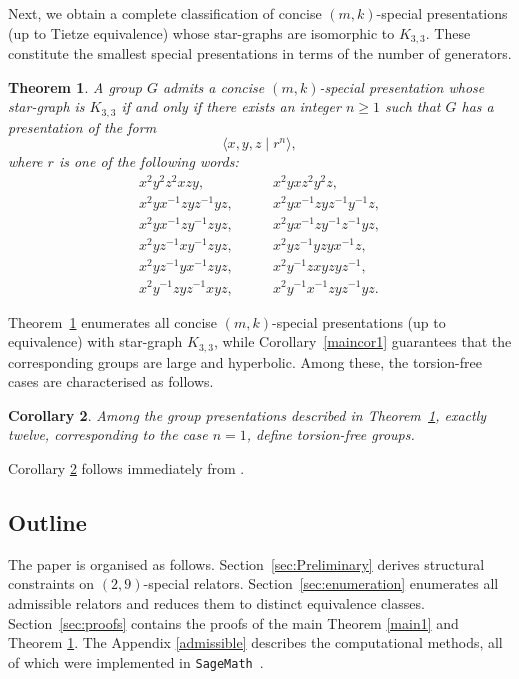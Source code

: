 \documentclass[a4paper,12pt,oneside]{article}
\newtheorem{maintheorem}{Theorem}
\newtheorem{maincorollary}[maintheorem]{Corollary}
\begin{document}
\medskip
Next, we obtain a complete classification of concise $(m,k)$-special presentations (up to Tietze equivalence) whose star-graphs are isomorphic to $K_{3,3}$. These constitute the smallest special presentations in terms of the number of generators.
\newpage
\begin{maintheorem}\label{main2}
A group \(G\) admits a concise \((m,k)\)-special presentation whose star-graph is \(K_{3,3}\) if and only if there exists an integer \(n \ge 1\) such that \(G\) has a presentation of the form
\[
\langle x,y,z \mid r^n \rangle,
\]
where \(r\) is one of the following words:
\begin{align*}
x^2 y^2 z^2 x z y,
&\qquad x^2 y x z^2 y^2 z, \\
x^2 y x^{-1} z y z^{-1} y z, 
&\qquad x^2 y x^{-1} z y z^{-1} y^{-1} z, \\
x^2 y x^{-1} z y^{-1} z y z, 
&\qquad x^2 y x^{-1} z y^{-1} z^{-1} y z, \\
x^2 y z^{-1} x y^{-1} z y z, 
&\qquad x^2 y z^{-1} y z y x^{-1} z, \\
x^2 y z^{-1} y x^{-1} z y z, 
&\qquad x^2 y^{-1} z x y z y z^{-1}, \\
x^2 y^{-1} z y z^{-1} x y z,
&\qquad x^2 y^{-1} x^{-1} z y z^{-1} y z.
\end{align*}
\end{maintheorem}


\medskip
Theorem~\ref{main2} enumerates all concise $(m,k)$-special presentations (up to equivalence) with star-graph $K_{3,3}$, while Corollary~\ref{maincor1} guarantees that the corresponding groups are large and hyperbolic. Among these, the torsion-free cases are characterised as follows.

\begin{maincorollary}\label{maincor2}
Among the group presentations described in Theorem~\ref{main2}, exactly twelve, corresponding to the case $n=1$, define torsion-free groups.
\end{maincorollary}
Corollary \ref{maincor2} follows immediately from \cite[Theorem 3]{MR124384}.

\subsection{Outline}
The paper is organised as follows. Section~\ref{sec:Preliminary} derives structural constraints on $(2,9)$-special relators.  Section~\ref{sec:enumeration} enumerates all admissible relators and reduces them to distinct equivalence classes.  Section~\ref{sec:proofs} contains the proofs of the main Theorem \ref{main1} and Theorem \ref{main2}.  The Appendix \ref{admissible} describes the computational methods, all of which were implemented in \texttt{SageMath}~\cite{sagemath}.
\end{document}
